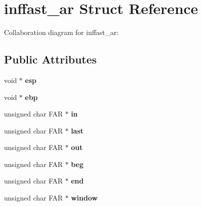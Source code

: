 \hypertarget{structinffast__ar}{\section{inffast\+\_\+ar Struct Reference}
\label{structinffast__ar}
}


Collaboration diagram for inffast\+\_\+ar\+:
\subsection*{Public Attributes}
\begin{DoxyCompactItemize}
\item 
\hypertarget{structinffast__ar_ab77648b95992884eef1eea1c094f0f5c}{void $\ast$ {\bfseries esp}}\label{structinffast__ar_ab77648b95992884eef1eea1c094f0f5c}

\item 
\hypertarget{structinffast__ar_adfa3fef4a1d16ad6cdf6a17afaeef15c}{void $\ast$ {\bfseries ebp}}\label{structinffast__ar_adfa3fef4a1d16ad6cdf6a17afaeef15c}

\item 
\hypertarget{structinffast__ar_a63dcaeb2ae9602b76388b3335cd199d3}{unsigned char F\+A\+R $\ast$ {\bfseries in}}\label{structinffast__ar_a63dcaeb2ae9602b76388b3335cd199d3}

\item 
\hypertarget{structinffast__ar_a6c55b962d2575ed760660a282aa09d4c}{unsigned char F\+A\+R $\ast$ {\bfseries last}}\label{structinffast__ar_a6c55b962d2575ed760660a282aa09d4c}

\item 
\hypertarget{structinffast__ar_a2863255162dfd09cc0c880f2d02634e6}{unsigned char F\+A\+R $\ast$ {\bfseries out}}\label{structinffast__ar_a2863255162dfd09cc0c880f2d02634e6}

\item 
\hypertarget{structinffast__ar_a054bfd6626da2bfc4da21021df587402}{unsigned char F\+A\+R $\ast$ {\bfseries beg}}\label{structinffast__ar_a054bfd6626da2bfc4da21021df587402}

\item 
\hypertarget{structinffast__ar_a5d081719f0eb7efc51d2a4fa20366f88}{unsigned char F\+A\+R $\ast$ {\bfseries end}}\label{structinffast__ar_a5d081719f0eb7efc51d2a4fa20366f88}

\item 
\hypertarget{structinffast__ar_a3445bda0f871b1cc562b7456161fa815}{unsigned char F\+A\+R $\ast$ {\bfseries window}}\label{structinffast__ar_a3445bda0f871b1cc562b7456161fa815}


\end{DoxyCompactItemize}
